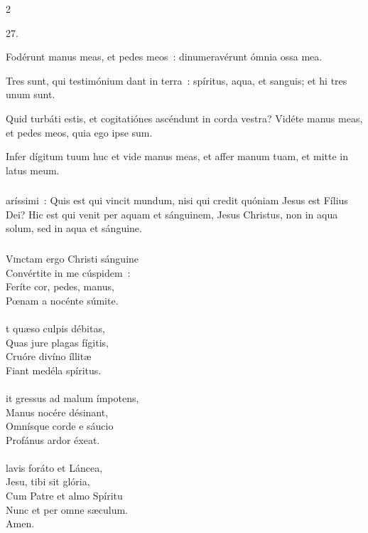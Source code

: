 \documentclass[9pt,twoside]{extarticle}
\begin{document}
\begin{multicols}{2}
\begin{tightlist}{}
\item {} 27.
\item {} Fodérunt manus meas, et pedes meos~: dinumeravérunt ómnia ossa mea.
\item {} Tres sunt, qui testimónium dant in terra~: spíritus, aqua, et sanguis; et hi tres unum sunt.
\item {} Quid turbáti estis, et cogitatiónes ascéndunt in corda vestra? Vidéte manus meas, et pedes meos, quia ego ipse sum.
\item {} Infer dígitum tuum huc et vide manus meas, et affer manum tuam, et mitte in latus meum.
\end{tightlist}

\subsubsection*{}
aríssimi~: Quis est qui vincit mundum, nisi qui credit quóniam Jesus est Fílius Dei? Hic est qui venit per aquam et sánguinem, Jesus Christus, non in aqua solum, sed in aqua et sánguine.

\subsubsection*{\center {}}
\lettrine{V}inctam ergo Christi sánguine\\
Convértite in me cúspidem~:\\
Feríte cor, pedes, manus,\\
Pœnam a nocénte súmite.\\
\\
t quæso culpis débitas,\\
Quas jure plagas fígitis,\\
Cruóre divíno íllitæ\\
Fiant medéla spíritus.\\
\\
it gressus ad malum ímpotens,\\
Manus nocére désinant,\\
Omnísque corde e sáucio\\
Profánus ardor éxeat.\\
\\
lavis foráto et Láncea,\\
Jesu, tibi sit glória,\\
Cum Patre et almo Spíritu\\
Nunc et per omne sæculum.\\
Amen.


\end{multicols}
\end{document}
